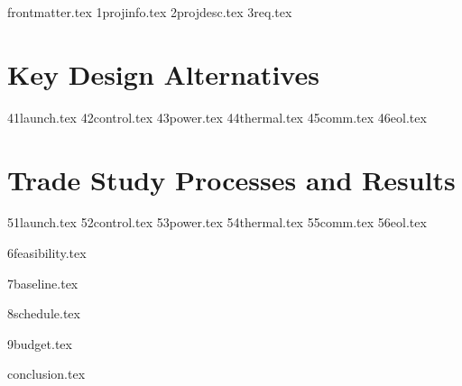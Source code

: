 \documentclass{ece}
\begin{document}
{frontmatter.tex}
{1projinfo.tex}
{2projdesc.tex} 
{3req.tex}

\section{Key Design Alternatives}
{41launch.tex}
{42control.tex}
{43power.tex}
{44thermal.tex}
{45comm.tex}
{46eol.tex}

\section{Trade Study Processes and Results}

{51launch.tex}
{52control.tex}
{53power.tex}
{54thermal.tex}
{55comm.tex}
{56eol.tex}

{6feasibility.tex}

{7baseline.tex}

{8schedule.tex}

{9budget.tex}

{conclusion.tex}

\pagebreak
%   


%
%
\end{document}
